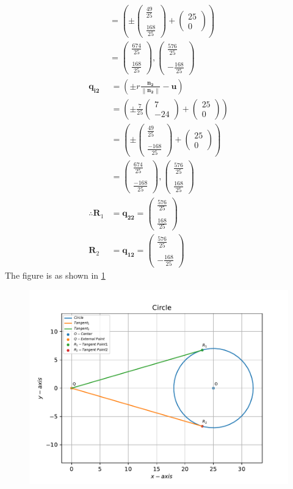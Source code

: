 \documentclass[12pt]{article}
\providecommand{\brak}[1]{\ensuremath{\left(#1\right)}}
\providecommand{\norm}[1]{\left\lVert#1\right\rVert}
\newcommand{\myvec}[1]{\ensuremath{\begin{pmatrix}#1\end{pmatrix}}}
\let\vec\mathbf
\begin{document}
\begin{enumerate}
\begin{align}
	&= \brak{\pm \myvec{\frac{49}{25} \\ \\[1pt] \frac{168}{25}} + \myvec{25\\0}} \\
	&= \myvec{\frac{674}{25} \\ \\[1pt] \frac{168}{25}}, \myvec{\frac{576}{25} \\ \\[1pt] -\frac{168}{25}}
\end{align}
\begin{align}
	\vec{q_{i2}} &= \brak{\pm r \frac{\vec{n_2}}{\norm{\vec{n_2}}}- \vec{u}} \\
	&= \brak{\pm \frac{7}{25}\myvec{7 \\ -24}+ \myvec{25 \\ 0}} \\
	&= \brak{\pm \myvec{\frac{49}{25} \\ \\[1pt] \frac{-168}{25}} + \myvec{25 \\ 0}} \\
	&= \myvec{\frac{674}{25} \\ \\[1pt] \frac{-168}{25}}, \myvec{\frac{576}{25} \\ \\[1pt] \frac{168}{25}}  \\
	\therefore \vec{R}_1 &= \vec{q_{22}} = \myvec{\frac{576}{25} \\ \\[1pt] \frac{168}{25}} \\
	\vec{R}_2 &= \vec{q_{12}} = \myvec{\frac{576}{25} \\ \\[1pt] -\frac{168}{25}}
\end{align}
The figure is as shown in \ref{fig:Fig1}
\begin{figure}[!h]
	\begin{center}
		\includegraphics[width=\columnwidth]{./figs/problem1.pdf}
	\end{center}
\caption{}
\label{fig:Fig1}
\end{figure}
\end{enumerate}
\end{document}
